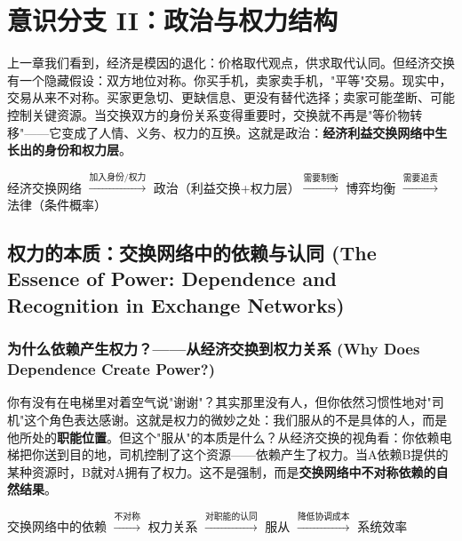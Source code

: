\documentclass[../main.tex]{subfiles}
\begin{document}
	\chapter{意识分支 II：政治与权力结构}

	\begin{motivation}

		上一章我们看到，经济是模因的退化：价格取代观点，供求取代认同。但经济交换有一个隐藏假设：双方地位对称。你买手机，卖家卖手机，"平等"交易。现实中，交易从来不对称。买家更急切、更缺信息、更没有替代选择；卖家可能垄断、可能控制关键资源。当交换双方的身份关系变得重要时，交换就不再是"等价物转移"——它变成了人情、义务、权力的互换。这就是政治：\textbf{经济利益交换网络中生长出的身份和权力层}。

	\end{motivation}

	\begin{logicmap}

		经济交换网络 $\xrightarrow{\text{加入身份/权力}}$ 政治（利益交换+权力层）$\xrightarrow{\text{需要制衡}}$ 博弈均衡 $\xrightarrow{\text{需要追责}}$ 法律（条件概率）

	\end{logicmap}

	\section{权力的本质：交换网络中的依赖与认同 (The Essence of Power: Dependence and Recognition in Exchange Networks)}
	
	\subsection{为什么依赖产生权力？——从经济交换到权力关系 (Why Does Dependence Create Power?)}
	
	\begin{motivation}

		你有没有在电梯里对着空气说"谢谢"？其实那里没有人，但你依然习惯性地对"司机"这个角色表达感谢。这就是权力的微妙之处：我们服从的不是具体的人，而是他所处的\textbf{职能位置}。但这个"服从"的本质是什么？从经济交换的视角看：你依赖电梯把你送到目的地，司机控制了这个资源——依赖产生了权力。当A依赖B提供的某种资源时，B就对A拥有了权力。这不是强制，而是\textbf{交换网络中不对称依赖的自然结果}。

	\end{motivation}
	
	\begin{logicmap}

		交换网络中的依赖 $\xrightarrow{\text{不对称}}$ 权力关系 $\xrightarrow{\text{对职能的认同}}$ 服从 $\xrightarrow{\text{降低协调成本}}$ 系统效率

	\end{logicmap}
	
\end{document}
